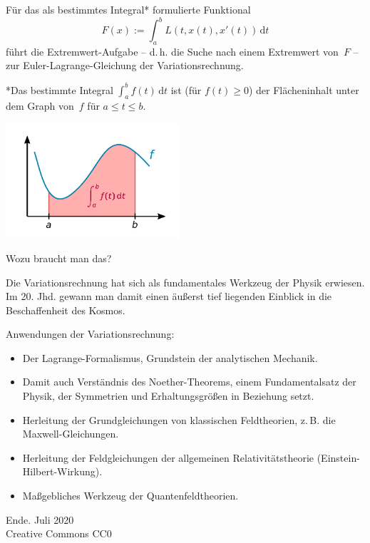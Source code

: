\documentclass[9pt]{beamer}
\newcommand{\modest}[1]{{\small\color{gray}#1}}
\begin{document}
\begin{frame}
Für das als bestimmtes Integral* formulierte Funktional
\[F(x) := \int_a^b L(t,x(t),x'(t))\,\mathrm dt\]
führt die Extremwert-Aufgabe -- d.\,h. die Suche nach einem Extremwert
von~$F$ -- zur Euler-Lagrange-Gleichung der Variationsrechnung.
\end{frame}

\begin{frame}

{\footnotesize
*Das bestimmte Integral $\int_a^b f(t)\,\mathrm dt$
ist (für $f(t)\ge 0$) der Flächeninhalt unter dem Graph
von~$f$ für $a\le t\le b$.}
\begin{center}
\includegraphics[width=64mm]{img/Integral.pdf}
\end{center}
\end{frame}

\begin{frame}
Wozu braucht man das?\pause

\vspace{0.8em}
Die Variationsrechnung hat sich als fundamentales Werkzeug der Physik
erwiesen. Im 20. Jhd. gewann man damit einen äußerst tief liegenden
Einblick in die Beschaffenheit des Kosmos.
\end{frame}

\begin{frame}
Anwendungen der Variationsrechnung:
\begin{itemize}
\item Der Lagrange-Formalismus, Grundstein der analytischen Mechanik.

\item Damit auch Verständnis des Noether-Theorems, einem
Fundamentalsatz der Physik, der Symmetrien und Erhaltungsgrößen
in Beziehung setzt.

\item Herleitung der Grundgleichungen von klassischen Feldtheorien,
z.\,B. die Maxwell-Gleichungen.

\item Herleitung der Feldgleichungen der allgemeinen
Relativitätstheorie (Einstein-Hilbert-Wirkung).

\item Maßgebliches Werkzeug der Quantenfeldtheorien.
\end{itemize}
\end{frame}

\begin{frame}
Ende.
\vfill\hfill\modest{Juli 2020}\\
\hfill\modest{Creative Commons CC0}
\end{frame}
\end{document}

